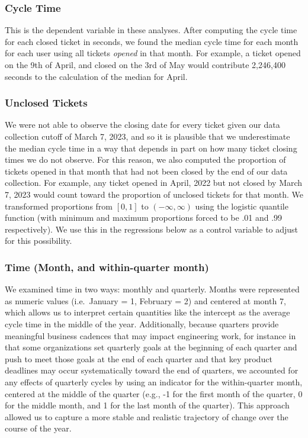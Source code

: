 \documentclass[
]{article}
\begin{document}
\subsubsection{Cycle Time}\label{cycle-time-1}

This is the dependent variable in these analyses. After computing the
cycle time for each closed ticket in seconds, we found the median cycle
time for each month for each user using all tickets \emph{opened} in
that month. For example, a ticket opened on the 9th of April, and closed
on the 3rd of May would contribute 2,246,400 seconds to the calculation
of the median for April.

\subsubsection{Unclosed Tickets}\label{unclosed-tickets}

We were not able to observe the closing date for every ticket given our
data collection cutoff of March 7, 2023, and so it is plausible that we
underestimate the median cycle time in a way that depends in part on how
many ticket closing times we do not observe. For this reason, we also
computed the proportion of tickets opened in that month that had not
been closed by the end of our data collection. For example, any ticket
opened in April, 2022 but not closed by March 7, 2023 would count toward
the proportion of unclosed tickets for that month. We transformed
proportions from \([0,1]\) to \((-\infty, \infty)\) using the logistic
quantile function (with minimum and maximum proportions forced to be .01
and .99 respectively). We use this in the regressions below as a control
variable to adjust for this possibility.

\subsubsection{Time (Month, and within-quarter
month)}\label{time-month-and-within-quarter-month}

We examined time in two ways: monthly and quarterly. Months were
represented as numeric values (i.e.~January = 1, February = 2) and
centered at month 7, which allows us to interpret certain quantities
like the intercept as the average cycle time in the middle of the year.
Additionally, because quarters provide meaningful business cadences that
may impact engineering work, for instance in that some organizations set
quarterly goals at the beginning of each quarter and push to meet those
goals at the end of each quarter and that key product deadlines may
occur systematically toward the end of quarters, we accounted for any
effects of quarterly cycles by using an indicator for the within-quarter
month, centered at the middle of the quarter (e.g., -1 for the first
month of the quarter, 0 for the middle month, and 1 for the last month
of the quarter). This approach allowed us to capture a more stable and
realistic trajectory of change over the course of the year.
\end{document}
